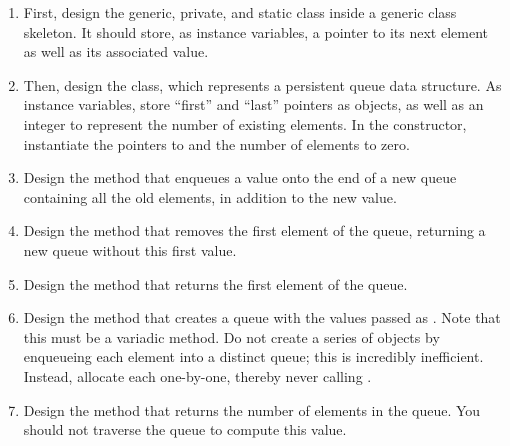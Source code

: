 \begin{enumerate}[label=(\alph*)]
    \item First, design the generic, private, and static class  inside a generic  class skeleton. It should store, as instance variables, a pointer to its next element as well as its associated value.
    \item Then, design the  class, which represents a persistent queue data structure. As instance variables, store ``first'' and ``last'' pointers as  objects, as well as an integer to represent the number of existing elements. In the constructor, instantiate the pointers to  and the number of elements to zero.
    \item Design the  method that enqueues a value onto the end of a new queue containing all the old elements, in addition to the new value.
    \item Design the  method that removes the first element of the queue, returning a new queue without this first value.
    \item Design the  method that returns the first element of the queue.
    \item Design the  method that creates a queue with the values passed as . Note that this must be a variadic method. Do not create a series of  objects by enqueueing each element into a distinct queue; this is incredibly inefficient. Instead, allocate each  one-by-one, thereby never calling .
    \item Design the  method that returns the number of elements in the queue. You should not traverse the queue to compute this value. 
\end{enumerate}